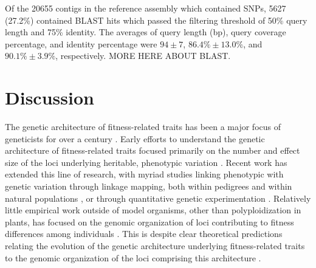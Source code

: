 \documentclass[smallextended]{svjour3}
\begin{document}
Of the \num{20655} contigs in the reference assembly which contained SNPs, \num{5627} (27.2\%) contained BLAST hits which 
passed the filtering threshold of 50\% query length and 75\% identity.  The averages of query length (bp), query coverage percentage, 
and identity percentage were $94 \pm 7$, $86.4\% \pm 13.0\%$, and $90.1\% \pm 
3.9\%$, respectively. MORE HERE ABOUT BLAST. 

\section*{Discussion}

The genetic architecture of fitness-related traits has been a major focus of geneticists for 
over a century \citep[reviewed by][]{Ellegren:2008}.
Early efforts to understand the genetic architecture of fitness-related traits
focused primarily on the number and effect size of the loci underlying heritable, phenotypic variation \citep{Fisher:1918}. 
Recent work has extended this line of research, with myriad studies linking phenotypic with genetic variation 
through linkage mapping, both within pedigrees \citep{Mauricio:2001, Neale:2011, Ritland:2011} and within 
natural populations \citep{Ingvarsson:2011, Eckert:2013a}, 
or through quantitative genetic experimentation \citep{Anderson:2013a, Anderson:2013b, Fournier-Level:2013}. Relatively 
little empirical work outside of model organisms, other than polyploidization in plants, has focused on the genomic organization 
of loci contributing to fitness differences 
among individuals \citep[but see][]{Stevison:2011}. This is despite clear theoretical predictions relating the evolution of 
the genetic architecture underlying fitness-related traits to the genomic organization of the loci comprising this 
architecture \citep{Kirkpatrick:2006, Yeaman:2011, Yeaman:2013, Akerman:2014}.
\end{document}
